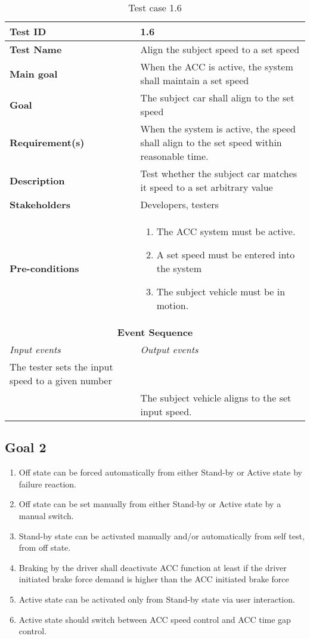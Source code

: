 \begin{table}[H]
\centering
\begin{tabularx}{\linewidth}{X|X}
  \hline
  \textbf{Test ID} & 1.6 \\
  \hline
  \textbf{Test Name} & Align the subject speed to a set speed \\
  \hline
  \textbf{Main goal} &  When the ACC is active, the system shall maintain a set speed
  \\
  \hline
  \textbf{Goal} & The subject car shall align to the set speed \\
  \hline
  \textbf{Requirement(s)} & When the system is active, the speed shall align to the set speed within reasonable time.\\
  \hline
  \textbf{Description} & Test whether the subject car matches it speed to a set arbitrary value \\
  \hline
  \textbf{Stakeholders} & Developers, testers \\
  \hline
  \textbf{Pre-conditions} & 
  \begin{enumerate}
      \item The ACC system must be active.
      \item A set speed must be entered into the system
      \item The subject vehicle must be in motion.
  \end{enumerate}
  \\
  \hline
  \multicolumn{2}{c}{\textbf{Event Sequence}} \\
  \hline
  \textit{Input events} & \textit{Output events} \\
  \hline
   The tester sets the input speed to a given number &  \\
  \hline
   &  The subject vehicle aligns to the set input speed.\\
  \hline
  \end{tabularx}
\caption{\label{tab_case6} Test case 1.6}
\end{table}

\newpage
\subsection{Goal 2}
\begin{enumerate}
    \item Off state can be forced automatically from either Stand-by or Active state by failure reaction.
    \item Off state can be set manually from either Stand-by or Active state by a manual switch.
    \item Stand-by state can be activated manually and/or automatically from self test, from off state.
    \item Braking by the driver shall deactivate ACC function at least if the driver initiated brake force demand is higher than the ACC initiated brake force
    
    
    \item Active state can be activated only from Stand-by state via user interaction.
    \item Active state should switch between ACC speed control and ACC time gap control.
\end{enumerate}


